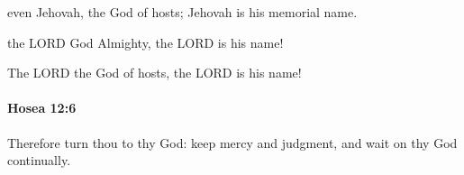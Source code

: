 			\begin{versebox}
					\item[BHS] 
					\item[LXX] 
					\item[ASV] even Jehovah, the God of hosts; Jehovah is his memorial name.
					\item[NIV] the LORD God Almighty, the LORD is his name!
					\item[NRSV] The LORD the God of hosts, the LORD is his name!
			\end{versebox}

		\paragraph{Hosea 12:6} %
			\label{HOSEA-12-6}

			Therefore turn thou to thy God: keep mercy and judgment, and wait on thy God continually.

